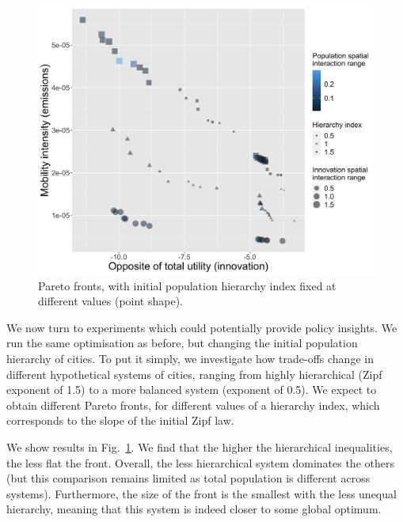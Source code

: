 \documentclass[final,5p,times,twocolumn,authoryear]{elsarticle}
\begin{document}



\begin{figure}
	\centering
	\includegraphics[width=\linewidth]{figures/pareto-oppAverageUtility-averageGravityFlow_VARYINGHIERARCHY_color-gravityDecay_size-innovationDecay.png}
	\caption{Pareto fronts, with initial population hierarchy index fixed at different values (point shape).\label{fig:fig2}}
\end{figure}


We now turn to experiments which could potentially provide policy insights. We run the same optimisation as before, but changing the initial population hierarchy of cities. To put it simply, we investigate how trade-offs change in different hypothetical systems of cities, ranging from highly hierarchical (Zipf exponent of 1.5) to a more balanced system (exponent of 0.5). We expect to obtain different Pareto fronts, for different values of a hierarchy index, which corresponds to the slope of the initial Zipf law.

We show results in Fig.~\ref{fig:fig2}. We find that the higher the hierarchical inequalities, the less flat the front. Overall, the less hierarchical system dominates the others (but this comparison remains limited as total population is different across systems). Furthermore, the size of the front is the smallest with the less unequal hierarchy, meaning that this system is indeed closer to some global optimum.
\end{document}
